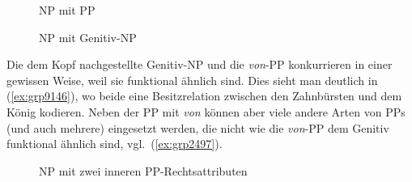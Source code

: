 \begin{exe}
  \ex\label{ex:grp9146}
  \begin{xlist}
  \end{xlist}
\end{exe}

\begin{figure}[!htbp]
  \centering
  \caption{NP mit PP}
  \label{fig:ngrmitprpgr}
\end{figure}

\begin{figure}[!htbp]
  \centering
  \caption{NP mit Genitiv-NP}
  \label{fig:ngrmitngr}
\end{figure}


Die dem Kopf nachgestellte Genitiv-NP und die \textit{von}-PP konkurrieren in einer gewissen Weise, weil sie funktional ähnlich sind.
Dies sieht man deutlich in (\ref{ex:grp9146}), wo beide eine Besitzrelation zwischen den Zahnbürsten und dem König kodieren.
Neben der PP mit \textit{von} können aber viele andere Arten von PPs (und auch mehrere) eingesetzt werden, die nicht wie die \textit{von}-PP dem Genitiv funktional ähnlich sind, vgl.\ (\ref{ex:grp2497}).

\begin{exe}
  \ex\label{ex:grp2497}
  \begin{xlist}
  \end{xlist}
\end{exe}

\begin{figure}[!htbp]
  \centering
  \caption{NP mit zwei inneren PP-Rechtsattributen}
  \label{fig:grp2497c}
\end{figure}

